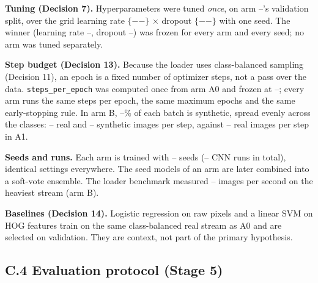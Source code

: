 \documentclass[11pt]{article}
\providecommand{\SeedsPerArm}{--}
\providecommand{\SyntheticSharePct}{--}
\providecommand{\TuningArm}{--}
\providecommand{\TuningLRs}{--}
\providecommand{\TuningDropouts}{--}
\providecommand{\NumRuns}{--}
\providecommand{\StepsPerEpoch}{--}
\providecommand{\TunedLR}{--}
\providecommand{\TunedDropout}{--}
\providecommand{\RealDrawsA}{--}
\providecommand{\RealDrawsB}{--}
\providecommand{\SynthDrawsB}{--}
\providecommand{\LoaderImagesPerSec}{--}
\begin{document}
\textbf{Tuning (Decision 7).} Hyperparameters were tuned \emph{once}, on arm
\TuningArm's validation split, over the grid learning rate
$\{\TuningLRs\}$ $\times$ dropout $\{\TuningDropouts\}$ with one seed. The
winner (learning rate \TunedLR, dropout \TunedDropout) was frozen for every
arm and every seed; no arm was tuned separately.

\textbf{Step budget (Decision 13).} Because the loader uses class-balanced
sampling (Decision 11), an epoch is a fixed number of optimizer steps, not a
pass over the data. \texttt{steps\_per\_epoch} was computed once from arm A0
and frozen at \StepsPerEpoch; every arm runs the same steps per epoch, the
same maximum epochs and the same early-stopping rule. In arm B,
\SyntheticSharePct\% of each batch is synthetic, spread evenly across the
classes: \RealDrawsB{} real and \SynthDrawsB{} synthetic images per step,
against \RealDrawsA{} real images per step in A1.

\textbf{Seeds and runs.} Each arm is trained with \SeedsPerArm{} seeds
(\NumRuns{} CNN runs in total), identical settings everywhere. The seed
models of an arm are later combined into a soft-vote ensemble. The loader
benchmark measured \LoaderImagesPerSec{} images per second on the heaviest
stream (arm B).

\textbf{Baselines (Decision 14).} Logistic regression on raw pixels and a
linear SVM on HOG features train on the same class-balanced real stream as
A0 and are selected on validation. They are context, not part of the primary
hypothesis.

\subsection*{C.4 Evaluation protocol (Stage 5)}
\end{document}
